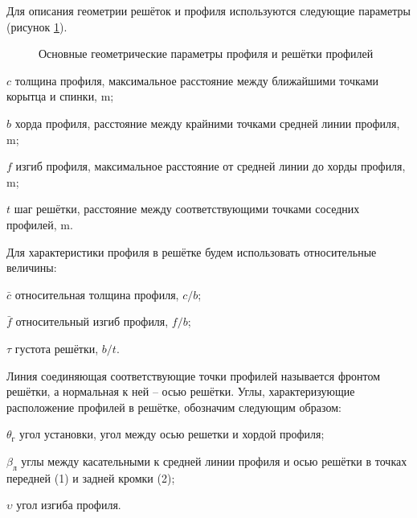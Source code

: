 Для описания геометрии решёток и профиля используются следующие параметры (рисунок \ref{fig:cascad}).  
\begin{figure} [ht]
	\caption{Основные геометрические параметры профиля и решётки профилей} 
	\label{fig:cascad}
\end{figure}
\eqexplSetIntro{}
\begin{eqexpl}
\item{\(c\)}  толщина профиля, максимальное расстояние между ближайшими точками корытца и спинки, \(\si\meter\); 
\item{\(b\)} хорда профиля, расстояние между крайними точками средней линии профиля, \(\si\meter\); 
\item{\(f\)} изгиб профиля, максимальное расстояние от средней линии до хорды профиля, \(\si\meter\);
\item{\(t\)} шаг решётки, расстояние между соответствующими точками соседних профилей, \(\si\meter\).
\end{eqexpl}
Для характеристики профиля в решётке будем использовать относительные величины: 
\begin{eqexpl}
\item{\(\bar{c}\)} относительная толщина профиля, \(c/b\); 
\item{\(\bar{f}\)} относительный изгиб профиля, \(f/b\);
\item{\(\tau\)} густота решётки, \(b/t\).
\end{eqexpl}
Линия соединяющая соответствующие точки профилей называется фронтом решётки, а нормальная к ней – осью решётки. Углы, характеризующие расположение профилей в решётке, обозначим следующим образом:
\begin{eqexpl}
\item{\(\theta_{\text{г}}\)} угол установки, угол между осью решетки и хордой профиля; 
\item{\(\beta_\text{л}\)} углы между касательными к средней линии профиля и осью решётки в точках передней (1) и задней кромки (2);
\item{\(\upsilon\)} угол изгиба профиля.
\end{eqexpl}

